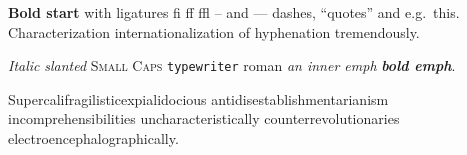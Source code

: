 \documentclass{beamer}
\begin{document}
\frame{}
\begin{frame}[t]

  \textbf{Bold start} with ligatures fi ff ffl -- and --- dashes, ``quotes'' and e.g.~this. Characterization internationalization of hyphenation tremendously.

  \textit{Italic} \textsl{slanted} \textsc{Small Caps} \texttt{typewriter} \textrm{roman} \emph{an \emph{inner} emph} \textbf{\emph{bold emph}}.


\end{frame}
\begin{frame}
Supercalifragilisticexpialidocious antidisestablishmentarianism incomprehensibilities uncharacteristically counterrevolutionaries electroencephalographically.
\end{frame}
\end{document}
